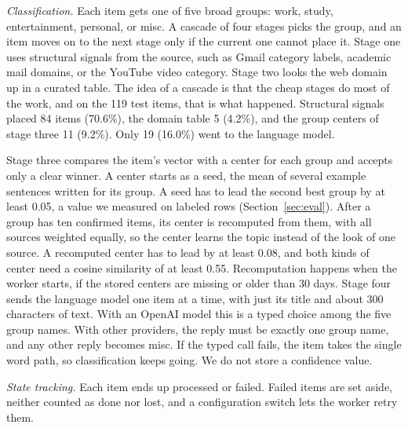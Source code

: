 \documentclass[conference]{IEEEtran}
\begin{document}
\textit{Classification.} Each item gets one of five broad groups: work, study, entertainment, personal, or misc. A cascade of four stages picks the group, and an item moves on to the next stage only if the current one cannot place it. Stage one uses structural signals from the source, such as Gmail category labels, academic mail domains, or the YouTube video category. Stage two looks the web domain up in a curated table. The idea of a cascade is that the cheap stages do most of the work, and on the 119 test items, that is what happened. Structural signals placed 84 items (70.6\%), the domain table 5 (4.2\%), and the group centers of stage three 11 (9.2\%). Only 19 (16.0\%) went to the language model.

Stage three compares the item's vector with a center for each group and accepts only a clear winner. A center starts as a seed, the mean of several example sentences written for its group. A seed has to lead the second best group by at least 0.05, a value we measured on labeled rows (Section~\ref{sec:eval}). After a group has ten confirmed items, its center is recomputed from them, with all sources weighted equally, so the center learns the topic instead of the look of one source. A recomputed center has to lead by at least 0.08, and both kinds of center need a cosine similarity of at least 0.55. Recomputation happens when the worker starts, if the stored centers are missing or older than 30 days. Stage four sends the language model one item at a time, with just its title and about 300 characters of text. With an OpenAI model this is a typed choice among the five group names. With other providers, the reply must be exactly one group name, and any other reply becomes misc. If the typed call fails, the item takes the single word path, so classification keeps going. We do not store a confidence value.

\textit{State tracking.} Each item ends up processed or failed. Failed items are set aside, neither counted as done nor lost, and a configuration switch lets the worker retry them.
\end{document}
